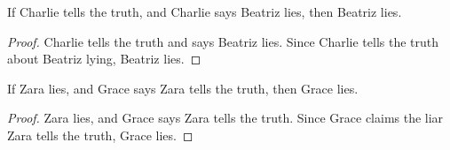 \begin{tcolorbox}[title=Rewritten Candidate Response, breakable]
\begin{lemma}
\label{lem:beatriz_lies}
If Charlie tells the truth, and Charlie says Beatriz lies, then Beatriz lies.
\end{lemma}
\begin{proof}
Charlie tells the truth and says Beatriz lies. Since Charlie tells the truth about Beatriz lying, Beatriz lies.
\end{proof}

\begin{lemma}
\label{lem:grace_lies}
If Zara lies, and Grace says Zara tells the truth, then Grace lies.
\end{lemma}
\begin{proof}
Zara lies, and Grace says Zara tells the truth. Since Grace claims the liar Zara tells the truth, Grace lies.
\end{proof}

\end{tcolorbox}






































